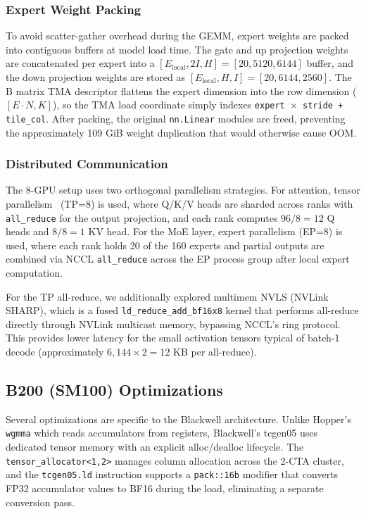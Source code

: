 \documentclass[sigplan,screen]{acmart}
\begin{document}
\subsubsection{Expert Weight Packing}

To avoid scatter-gather overhead during the GEMM, expert weights are packed into contiguous buffers at model load time. The gate and up projection weights are concatenated per expert into a $[E_{\text{local}}, 2I, H] = [20, 5120, 6144]$ buffer, and the down projection weights are stored as $[E_{\text{local}}, H, I] = [20, 6144, 2560]$. The B matrix TMA descriptor flattens the expert dimension into the row dimension ($[E \cdot N, K]$), so the TMA load coordinate simply indexes \texttt{expert $\times$ stride + tile\_col}. After packing, the original \texttt{nn.Linear} modules are freed, preventing the approximately 109 GiB weight duplication that would otherwise cause OOM.

\subsubsection{Distributed Communication}

The 8-GPU setup uses two orthogonal parallelism strategies. For attention, tensor parallelism~\cite{megatronlm} (TP=8) is used, where Q/K/V heads are sharded across ranks with \texttt{all\_reduce} for the output projection, and each rank computes $96/8 = 12$ Q heads and $8/8 = 1$ KV head. For the MoE layer, expert parallelism (EP=8) is used, where each rank holds 20 of the 160 experts and partial outputs are combined via NCCL \texttt{all\_reduce} across the EP process group after local expert computation.

For the TP all-reduce, we additionally explored multimem NVLS (NVLink SHARP), which is a fused \texttt{ld\_reduce\_add\_bf16x8} kernel that performs all-reduce directly through NVLink multicast memory, bypassing NCCL's ring protocol. This provides lower latency for the small activation tensors typical of batch-1 decode (approximately $6{,}144 \times 2 = 12$ KB per all-reduce).

\subsection{B200 (SM100) Optimizations}

Several optimizations are specific to the Blackwell architecture. Unlike Hopper's \texttt{wgmma} which reads accumulators from registers, Blackwell's tcgen05 uses dedicated tensor memory with an explicit alloc/dealloc lifecycle. The \newline \texttt{tensor\_allocator<1,2>} manages column allocation across the 2-CTA cluster, and the \texttt{tcgen05.ld} instruction supports a \texttt{pack::16b} modifier that converts FP32 accumulator values to BF16 during the load, eliminating a separate conversion pass.
\end{document}
